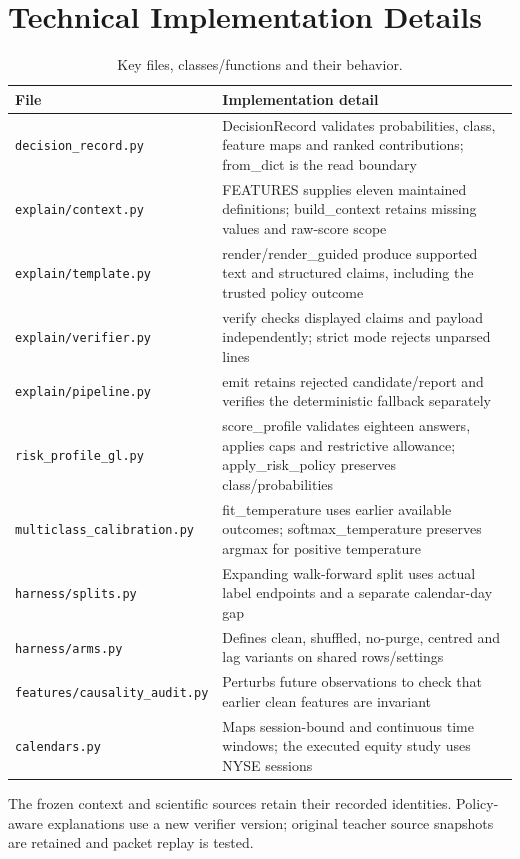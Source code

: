 \section{Technical Implementation Details}
\begingroup\small
\begin{longtable}{p{}p{}}
\caption{Key files, classes/functions and their behavior.}\label{tab:implementation-files}\\\toprule File & Implementation detail\\\midrule
\nolinkurl{decision_record.py} & DecisionRecord validates probabilities, class, feature maps and ranked contributions; from\_dict is the read boundary\\
\nolinkurl{explain/context.py} & FEATURES supplies eleven maintained definitions; build\_context retains missing values and raw-score scope\\
\nolinkurl{explain/template.py} & render/render\_guided produce supported text and structured claims, including the trusted policy outcome\\
\nolinkurl{explain/verifier.py} & verify checks displayed claims and payload independently; strict mode rejects unparsed lines\\
\nolinkurl{explain/pipeline.py} & emit retains rejected candidate/report and verifies the deterministic fallback separately\\
\nolinkurl{risk_profile_gl.py} & score\_profile validates eighteen answers, applies caps and restrictive allowance; apply\_risk\_policy preserves class/probabilities\\
\nolinkurl{multiclass_calibration.py} & fit\_temperature uses earlier available outcomes; softmax\_temperature preserves argmax for positive temperature\\
\nolinkurl{harness/splits.py} & Expanding walk-forward split uses actual label endpoints and a separate calendar-day gap\\
\nolinkurl{harness/arms.py} & Defines clean, shuffled, no-purge, centred and lag variants on shared rows/settings\\
\nolinkurl{features/causality_audit.py} & Perturbs future observations to check that earlier clean features are invariant\\
\nolinkurl{calendars.py} & Maps session-bound and continuous time windows; the executed equity study uses NYSE sessions\\
\bottomrule\end{longtable}\endgroup
The frozen context and scientific sources retain their recorded identities. Policy-aware explanations use a new verifier version; original teacher source snapshots are retained and packet replay is tested.
